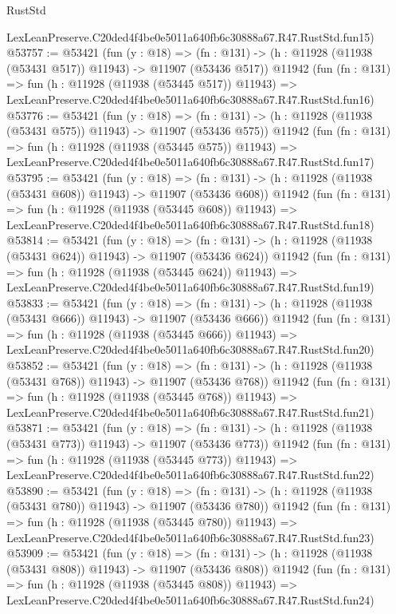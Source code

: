 \begin{lexlean}{RustStd}
\begin{coremodule}
    LexLeanPreserve.C20ded4f4be0e5011a640fb6c30888a67.R47.RustStd.fun15)
@53757 := @53421
    (fun (y : @18) =>
    (fn : @131) -> (h : @11928 (@11938 (@53431 @517)) @11943) -> @11907 (@53436 @517))
    @11942
    (fun (fn : @131) =>
    fun (h : @11928 (@11938 (@53445 @517)) @11943) =>
    LexLeanPreserve.C20ded4f4be0e5011a640fb6c30888a67.R47.RustStd.fun16)
@53776 := @53421
    (fun (y : @18) =>
    (fn : @131) -> (h : @11928 (@11938 (@53431 @575)) @11943) -> @11907 (@53436 @575))
    @11942
    (fun (fn : @131) =>
    fun (h : @11928 (@11938 (@53445 @575)) @11943) =>
    LexLeanPreserve.C20ded4f4be0e5011a640fb6c30888a67.R47.RustStd.fun17)
@53795 := @53421
    (fun (y : @18) =>
    (fn : @131) -> (h : @11928 (@11938 (@53431 @608)) @11943) -> @11907 (@53436 @608))
    @11942
    (fun (fn : @131) =>
    fun (h : @11928 (@11938 (@53445 @608)) @11943) =>
    LexLeanPreserve.C20ded4f4be0e5011a640fb6c30888a67.R47.RustStd.fun18)
@53814 := @53421
    (fun (y : @18) =>
    (fn : @131) -> (h : @11928 (@11938 (@53431 @624)) @11943) -> @11907 (@53436 @624))
    @11942
    (fun (fn : @131) =>
    fun (h : @11928 (@11938 (@53445 @624)) @11943) =>
    LexLeanPreserve.C20ded4f4be0e5011a640fb6c30888a67.R47.RustStd.fun19)
@53833 := @53421
    (fun (y : @18) =>
    (fn : @131) -> (h : @11928 (@11938 (@53431 @666)) @11943) -> @11907 (@53436 @666))
    @11942
    (fun (fn : @131) =>
    fun (h : @11928 (@11938 (@53445 @666)) @11943) =>
    LexLeanPreserve.C20ded4f4be0e5011a640fb6c30888a67.R47.RustStd.fun20)
@53852 := @53421
    (fun (y : @18) =>
    (fn : @131) -> (h : @11928 (@11938 (@53431 @768)) @11943) -> @11907 (@53436 @768))
    @11942
    (fun (fn : @131) =>
    fun (h : @11928 (@11938 (@53445 @768)) @11943) =>
    LexLeanPreserve.C20ded4f4be0e5011a640fb6c30888a67.R47.RustStd.fun21)
@53871 := @53421
    (fun (y : @18) =>
    (fn : @131) -> (h : @11928 (@11938 (@53431 @773)) @11943) -> @11907 (@53436 @773))
    @11942
    (fun (fn : @131) =>
    fun (h : @11928 (@11938 (@53445 @773)) @11943) =>
    LexLeanPreserve.C20ded4f4be0e5011a640fb6c30888a67.R47.RustStd.fun22)
@53890 := @53421
    (fun (y : @18) =>
    (fn : @131) -> (h : @11928 (@11938 (@53431 @780)) @11943) -> @11907 (@53436 @780))
    @11942
    (fun (fn : @131) =>
    fun (h : @11928 (@11938 (@53445 @780)) @11943) =>
    LexLeanPreserve.C20ded4f4be0e5011a640fb6c30888a67.R47.RustStd.fun23)
@53909 := @53421
    (fun (y : @18) =>
    (fn : @131) -> (h : @11928 (@11938 (@53431 @808)) @11943) -> @11907 (@53436 @808))
    @11942
    (fun (fn : @131) =>
    fun (h : @11928 (@11938 (@53445 @808)) @11943) =>
    LexLeanPreserve.C20ded4f4be0e5011a640fb6c30888a67.R47.RustStd.fun24)

\end{coremodule}
\end{lexlean}
